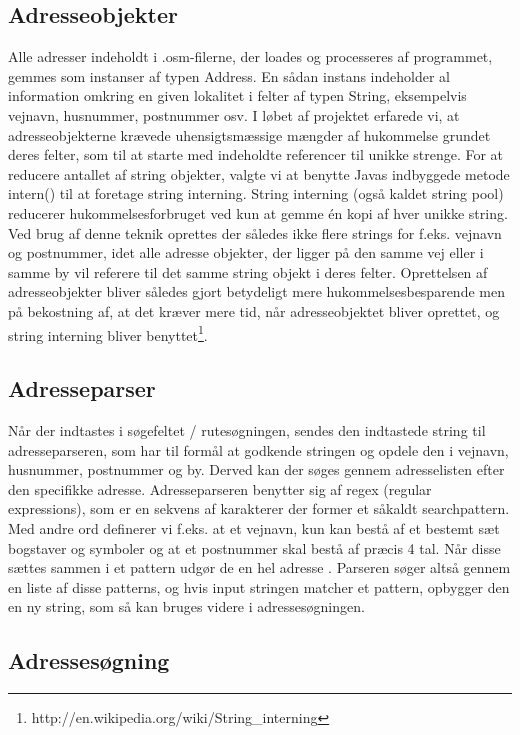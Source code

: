 \documentclass[a4paper]{article}
\begin{document}
\subsection{Adresseobjekter}
Alle adresser indeholdt i .osm-filerne, der loades og processeres af programmet, gemmes som instanser af typen Address. En sådan instans indeholder al information omkring en given lokalitet i felter af typen String, eksempelvis vejnavn, husnummer, postnummer osv. I løbet af projektet erfarede vi, at adresseobjekterne krævede uhensigtsmæssige mængder af hukommelse grundet deres felter, som til at starte med indeholdte referencer til unikke strenge. For at reducere antallet af string objekter, valgte vi at benytte Javas indbyggede metode intern() til at foretage string interning. String interning (også kaldet string pool) reducerer hukommelsesforbruget ved kun at gemme én kopi af hver unikke string. Ved brug af denne teknik oprettes der således ikke flere strings for f.eks. vejnavn og postnummer, idet alle adresse objekter, der ligger på den samme vej eller i samme by vil referere til det samme string objekt i deres felter. Oprettelsen af adresseobjekter bliver således gjort betydeligt mere hukommelsesbesparende men på bekostning af, at det kræver mere tid, når adresseobjektet bliver oprettet, og string interning bliver benyttet\footnote{http://en.wikipedia.org/wiki/String\_interning}.

\subsection{Adresseparser}
Når der indtastes i søgefeltet / rutesøgningen, sendes den indtastede string til adresseparseren, som har til formål at godkende stringen og opdele den i vejnavn, husnummer, postnummer og by. Derved kan der søges gennem adresselisten efter den specifikke adresse. Adresseparseren benytter sig af regex (regular expressions), som er en sekvens af karakterer der former et såkaldt searchpattern. Med andre ord definerer vi f.eks. at et vejnavn, kun kan bestå af et bestemt sæt bogstaver og symboler og at et postnummer skal bestå af præcis 4 tal. Når disse sættes sammen i et pattern udgør de en hel adresse . Parseren søger altså gennem en liste af disse patterns, og hvis input stringen matcher et pattern, opbygger den en ny string, som så kan bruges videre i adressesøgningen.

\subsection{Adressesøgning}
\end{document}
